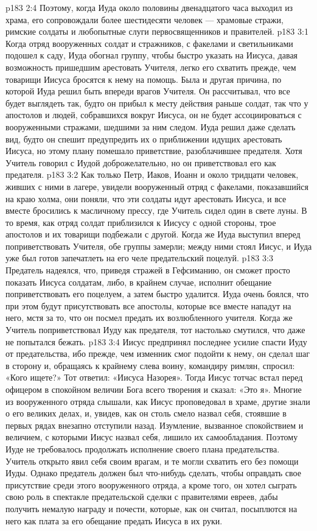 \vs p183 2:4 Поэтому, когда Иуда около половины двенадцатого часа выходил из храма, его сопровождали более шестидесяти человек --- храмовые стражи, римские солдаты и любопытные слуги первосвященников и правителей.
\vs p183 3:1 Когда отряд вооруженных солдат и стражников, с факелами и светильниками подошел к саду, Иуда обогнал группу, чтобы быстро указать на Иисуса, давая возможность пришедшим арестовать Учителя, легко его схватить прежде, чем товарищи Иисуса бросятся к нему на помощь. Была и другая причина, по которой Иуда решил быть впереди врагов Учителя. Он рассчитывал, что все будет выглядеть так, будто он прибыл к месту действия раньше солдат, так что у апостолов и людей, собравшихся вокруг Иисуса, он не будет ассоциироваться с вооруженными стражами, шедшими за ним следом. Иуда решил даже сделать вид, будто он спешит предупредить их о приближении идущих арестовать Иисуса, но этому плану помешало приветствие, разоблачившее предателя. Хотя Учитель говорил с Иудой доброжелательно, но он приветствовал его как предателя.
\vs p183 3:2 Как только Петр, Иаков, Иоанн и около тридцати человек, живших с ними в лагере, увидели вооруженный отряд с факелами, показавшийся на краю холма, они поняли, что эти солдаты идут арестовать Иисуса, и все вместе бросились к масличному прессу, где Учитель сидел один в свете луны. В то время, как отряд солдат приблизился к Иисусу с одной стороны, трое апостолов и их товарищи подбежали с другой. Когда же Иуда выступил вперед поприветствовать Учителя, обе группы замерли; между ними стоял Иисус, и Иуда уже был готов запечатлеть на его челе предательский поцелуй.
\vs p183 3:3 Предатель надеялся, что, приведя стражей в Гефсиманию, он сможет просто показать Иисуса солдатам, либо, в крайнем случае, исполнит обещание поприветствовать его поцелуем, а затем быстро удалится. Иуда очень боялся, что при этом будут присутствовать все апостолы, которые все вместе нападут на него, мстя за то, что он посмел предать их возлюбленного учителя. Когда же Учитель поприветствовал Иуду как предателя, тот настолько смутился, что даже не попытался бежать.
\vs p183 3:4 Иисус предпринял последнее усилие спасти Иуду от предательства, ибо прежде, чем изменник смог подойти к нему, он сделал шаг в сторону и, обращаясь к крайнему слева воину, командиру римлян, спросил: «Кого ищете?» Тот ответил: «Иисуса Назорея». Тогда Иисус тотчас встал перед офицером в спокойном величии Бога всего творения и сказал: «Это я». Многие из вооруженного отряда слышали, как Иисус проповедовал в храме, другие знали о его великих делах, и, увидев, как он столь смело назвал себя, стоявшие в первых рядах внезапно отступили назад. Изумление, вызванное спокойствием и величием, с которыми Иисус назвал себя, лишило их самообладания. Поэтому Иуде не требовалось продолжать исполнение своего плана предательства. Учитель открыто явил себя своим врагам, и те могли схватить его без помощи Иуды. Однако предатель должен был что\hyp{}нибудь сделать, чтобы оправдать свое присутствие среди этого вооруженного отряда, а кроме того, он хотел сыграть свою роль в спектакле предательской сделки с правителями евреев, дабы получить немалую награду и почести, которые, как он считал, посыплются на него как плата за его обещание предать Иисуса в их руки.
